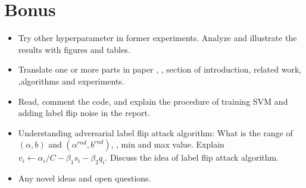 \documentclass[12pt]{article}
\begin{document}
\section{Bonus}

\begin{itemize}    
    \item Try other hyperparameter in former experiments. Analyze and illustrate the results with figures and tables. 
    \item Translate one or more parts in paper \cite{biggio2011support}, \eg, section of introduction, related work, ,algorithms and experiments. 
    \item Read, comment the code, and explain the procedure of training SVM and adding label flip noise in the report. 
    \item Understanding adversarial label flip attack algorithm: What is the range of $(\alpha,b)$ and $(\alpha^{rnd},b^{rnd})$, \ie, min and max value. Explain $v_i \leftarrow \alpha_i /C -\beta_1 s_i -\beta_2 q_i $. Discuss the idea of label flip attack algorithm. 
    \item Any novel ideas and open questions. 
\end{itemize}
\printbibliography
\end{document}
